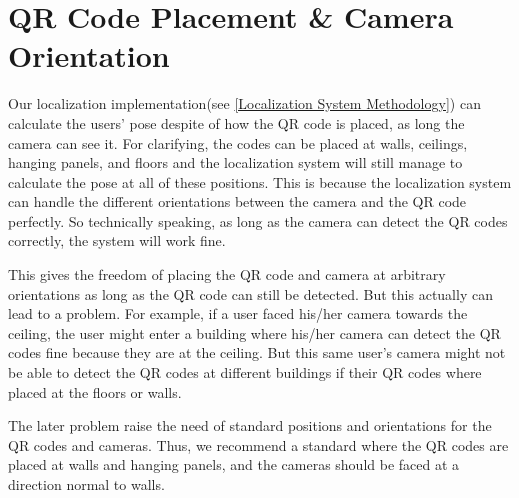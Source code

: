 \section{QR Code Placement \& Camera Orientation}
Our localization implementation(see \ref{Localization System Methodology}) can calculate the users' pose despite of how the QR code is placed, as long the camera can see it. For clarifying, the codes can be placed at walls, ceilings, hanging panels, and floors and the localization system will still manage to calculate the pose at all of these positions. This is because the localization system can handle the different orientations between the camera and the QR code perfectly. So technically speaking, as long as the camera can detect the QR codes correctly, the system will work fine.

This gives the freedom of placing the QR code and camera at arbitrary orientations as long as the QR code can still be detected. But this actually can lead to a problem. For example, if a user faced his/her camera towards the ceiling, the user might enter a building where his/her camera can detect the QR codes fine because they are at the ceiling. But this same user's camera might not be able to detect the QR codes at different buildings if their QR codes where placed at the floors or walls.

The later problem raise the need of standard positions and orientations for the QR codes and cameras. Thus, we recommend a standard where the QR codes are placed at walls and hanging panels, and the cameras should be faced at a direction normal to walls.